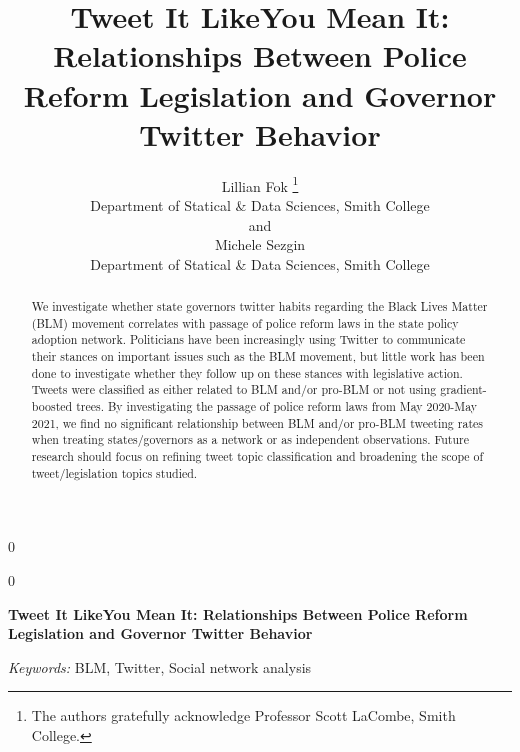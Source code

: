\documentclass[12pt]{article}
\newcommand{\blind}{0}
\begin{document}
\def\spacingset#1{\renewcommand{\baselinestretch}%
{#1}\small\normalsize} \spacingset{1}



\blind
{
  \title{\bf Tweet It LikeYou Mean It: Relationships Between Police
Reform Legislation and Governor Twitter Behavior}

  \author{
        Lillian Fok \thanks{The authors gratefully acknowledge Professor
Scott LaCombe, Smith College.} \\
    Department of Statical \& Data Sciences, Smith College\\
     and \\     Michele Sezgin \\
    Department of Statical \& Data Sciences, Smith College\\
      }
  \maketitle
} \fi

\blind
{
  \bigskip
  \bigskip
  \bigskip
  \begin{center}
    {\LARGE\bf Tweet It LikeYou Mean It: Relationships Between Police
Reform Legislation and Governor Twitter Behavior}
  \end{center}
  \medskip
} \fi

\bigskip
\begin{abstract}
We investigate whether state governors twitter habits regarding the
Black Lives Matter (BLM) movement correlates with passage of police
reform laws in the state policy adoption network. Politicians have been
increasingly using Twitter to communicate their stances on important
issues such as the BLM movement, but little work has been done to
investigate whether they follow up on these stances with legislative
action. Tweets were classified as either related to BLM and/or pro-BLM
or not using gradient-boosted trees. By investigating the passage of
police reform laws from May 2020-May 2021, we find no significant
relationship between BLM and/or pro-BLM tweeting rates when treating
states/governors as a network or as independent observations. Future
research should focus on refining tweet topic classification and
broadening the scope of tweet/legislation topics studied.
\end{abstract}

\noindent%
{\it Keywords:} BLM, Twitter, Social network analysis
\vfill
\end{document}
